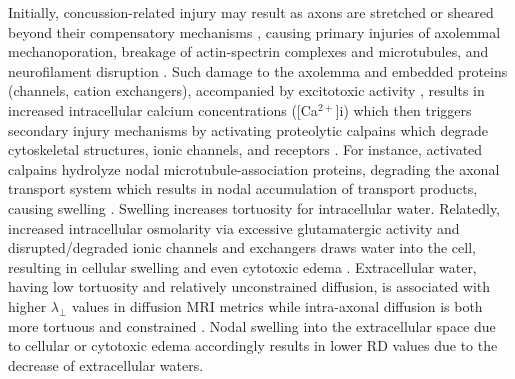 \documentclass[12pt]{article}
\begin{document}
Initially, concussion-related injury may result as axons are stretched or sheared beyond their compensatory mechanisms \parencite[e.g. spectrin elongation;][]{dubey2020AxonalActinspectrinLattice}, causing primary injuries of axolemmal mechanoporation, breakage of actin-spectrin complexes and microtubules, and neurofilament disruption \parencite{christman1994UltrastructuralStudiesDiffuse,povlishock1997ImpactAccelerationInjury,pettus1996CharacterizationDistinctSet}. Such damage to the axolemma and embedded proteins (channels, cation exchangers), accompanied by excitotoxic activity \parencite{baracaldo-santamaria2022RevisitingExcitotoxicityTraumatic}, results in increased intracellular calcium concentrations ([Ca$^{2+}$]i) which then triggers secondary injury mechanisms by activating proteolytic calpains which degrade cytoskeletal structures, ionic channels, and receptors \parencite{krieg2023IdentifyingPhenotypesDiffuse}. For instance, activated calpains hydrolyze nodal microtubule-association proteins, degrading the axonal transport system which results in nodal accumulation of transport products, causing swelling \parencite[i.e. varicosities, when stained for $\beta$-amyloid precursor protein;][]{ma2013RoleCalpainsInjuryinduced,johnson2013AxonalPathologyTraumatic,shin2020AxonalTransportDysfunction}. Swelling increases tortuosity for intracellular water. Relatedly, increased intracellular osmolarity via excessive glutamatergic activity and disrupted/degraded ionic channels and exchangers draws water into the cell, resulting in cellular swelling and even cytotoxic edema \parencite{rungta2015CellularMechanismsNeuronal,liang2007CytotoxicEdemaMechanisms,baracaldo-santamaria2022RevisitingExcitotoxicityTraumatic}. Extracellular water, having low tortuosity and relatively unconstrained diffusion, is associated with higher $\lambda_\perp$ values in diffusion MRI metrics while intra-axonal diffusion is both more tortuous and constrained \parencite{mayer2010ProspectiveDiffusionTensor,rosenblum2007CytotoxicEdemaMonitoring}. Nodal swelling into the extracellular space due to cellular or cytotoxic edema accordingly results in lower RD values due to the decrease of extracellular waters.
\end{document}
